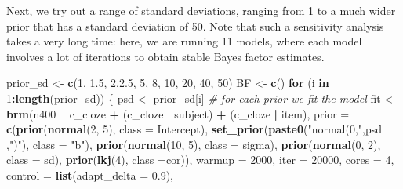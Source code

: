 \documentclass[12pt,]{krantz}
\newenvironment{Shaded}{\begin{snugshade}}{\end{snugshade}}
\newcommand{\KeywordTok}[1]{\textcolor[rgb]{0.13,0.29,0.53}{\textbf{#1}}}
\newcommand{\DataTypeTok}[1]{\textcolor[rgb]{0.13,0.29,0.53}{#1}}
\newcommand{\DecValTok}[1]{\textcolor[rgb]{0.00,0.00,0.81}{#1}}
\newcommand{\FloatTok}[1]{\textcolor[rgb]{0.00,0.00,0.81}{#1}}
\newcommand{\StringTok}[1]{\textcolor[rgb]{0.31,0.60,0.02}{#1}}
\newcommand{\CommentTok}[1]{\textcolor[rgb]{0.56,0.35,0.01}{\textit{#1}}}
\newcommand{\ControlFlowTok}[1]{\textcolor[rgb]{0.13,0.29,0.53}{\textbf{#1}}}
\newcommand{\OperatorTok}[1]{\textcolor[rgb]{0.81,0.36,0.00}{\textbf{#1}}}
\newcommand{\NormalTok}[1]{#1}
\theoremstyle{definition}
\theoremstyle{definition}
\theoremstyle{definition}
\theoremstyle{remark}
\begin{document}
Next, we try out a range of standard deviations, ranging from 1 to a
much wider prior that has a standard deviation of 50. Note that such a
sensitivity analysis takes a very long time: here, we are running 11
models, where each model involves a lot of iterations to obtain stable
Bayes factor estimates.

\begin{Shaded}
\begin{Highlighting}[]
\NormalTok{prior_sd <-}\StringTok{ }\KeywordTok{c}\NormalTok{(}\DecValTok{1}\NormalTok{, }\FloatTok{1.5}\NormalTok{, }\DecValTok{2}\NormalTok{,}\FloatTok{2.5}\NormalTok{, }\DecValTok{5}\NormalTok{, }\DecValTok{8}\NormalTok{, }\DecValTok{10}\NormalTok{, }\DecValTok{20}\NormalTok{, }\DecValTok{40}\NormalTok{, }\DecValTok{50}\NormalTok{)}
\NormalTok{BF <-}\StringTok{ }\KeywordTok{c}\NormalTok{()}
\ControlFlowTok{for}\NormalTok{ (i }\ControlFlowTok{in} \DecValTok{1}\OperatorTok{:}\KeywordTok{length}\NormalTok{(prior_sd)) \{}
\NormalTok{    psd <-}\StringTok{ }\NormalTok{prior_sd[i]}
      \CommentTok{# for each prior we fit the model}
\NormalTok{    fit <-}\StringTok{ }\KeywordTok{brm}\NormalTok{(n400 }\OperatorTok{~}\StringTok{ }\NormalTok{c_cloze }\OperatorTok{+}\StringTok{ }\NormalTok{(c_cloze }\OperatorTok{|}\StringTok{ }\NormalTok{subject) }\OperatorTok{+}\StringTok{ }\NormalTok{(c_cloze }\OperatorTok{|}\StringTok{ }\NormalTok{item),}
               \DataTypeTok{prior =}
                 \KeywordTok{c}\NormalTok{(}\KeywordTok{prior}\NormalTok{(}\KeywordTok{normal}\NormalTok{(}\DecValTok{2}\NormalTok{, }\DecValTok{5}\NormalTok{), }\DataTypeTok{class =}\NormalTok{ Intercept),}
                   \KeywordTok{set_prior}\NormalTok{(}\KeywordTok{paste0}\NormalTok{(}\StringTok{"normal(0,"}\NormalTok{,psd ,}\StringTok{")"}\NormalTok{), }\DataTypeTok{class =} \StringTok{"b"}\NormalTok{),}
                   \KeywordTok{prior}\NormalTok{(}\KeywordTok{normal}\NormalTok{(}\DecValTok{10}\NormalTok{, }\DecValTok{5}\NormalTok{), }\DataTypeTok{class =}\NormalTok{ sigma),}
                   \KeywordTok{prior}\NormalTok{(}\KeywordTok{normal}\NormalTok{(}\DecValTok{0}\NormalTok{, }\DecValTok{2}\NormalTok{), }\DataTypeTok{class =}\NormalTok{ sd),}
                   \KeywordTok{prior}\NormalTok{(}\KeywordTok{lkj}\NormalTok{(}\DecValTok{4}\NormalTok{), }\DataTypeTok{class =}\NormalTok{cor)),}
               \DataTypeTok{warmup  =} \DecValTok{2000}\NormalTok{,}
               \DataTypeTok{iter    =} \DecValTok{20000}\NormalTok{,}
               \DataTypeTok{cores   =} \DecValTok{4}\NormalTok{,}
               \DataTypeTok{control =} \KeywordTok{list}\NormalTok{(}\DataTypeTok{adapt_delta =} \FloatTok{0.9}\NormalTok{),}

\end{Highlighting}
\end{Shaded}
\end{document}
